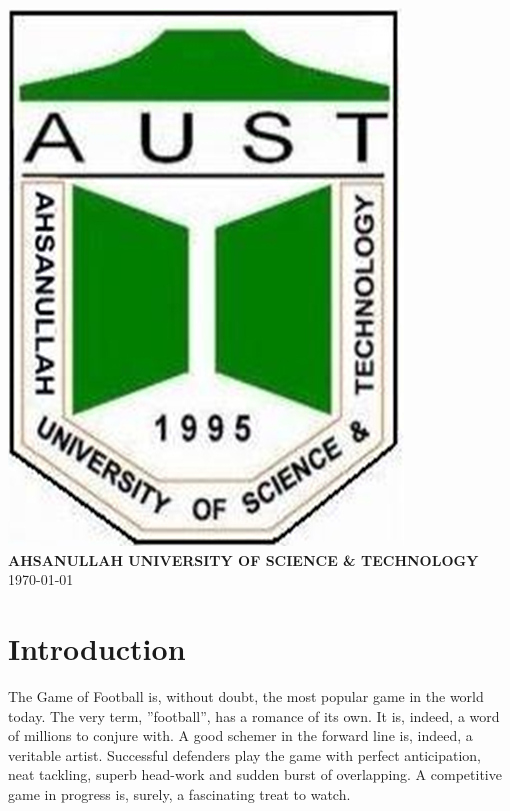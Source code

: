 \documentclass[10pt,a4paper]{article}
\begin{document}
\begin{center}
\vspace{0.8cm}
\vspace{0.4cm}
\includegraphics[scale=0.25]{LogoAust.jpg}\\
\vspace{0.4cm}
\Large{\textbf{AHSANULLAH UNIVERSITY OF SCIENCE \& TECHNOLOGY}}\\
\vspace{0.8cm}
\today

\vspace{0.5cm}
\end{center}


\newpage

\section{Introduction}
The Game of Football is, without doubt, the most popular game in the world today. The very term, ''football'', has a romance of its own. It is, indeed, a word of millions to conjure with. A good schemer in the forward line is, indeed, a veritable artist. Successful defenders play the game with perfect anticipation, neat tackling, superb head-work and sudden burst of overlapping. A competitive game in progress is, surely, a fascinating treat to watch.\\
\end{document}
